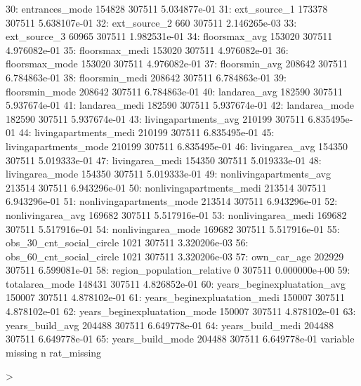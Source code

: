 \documentclass[a4paper]{article}
\begin{document}
\begin{Schunk}
\begin{Soutput}
30:               entrances_mode  154828 307511 5.034877e-01
31:                 ext_source_1  173378 307511 5.638107e-01
32:                 ext_source_2     660 307511 2.146265e-03
33:                 ext_source_3   60965 307511 1.982531e-01
34:                floorsmax_avg  153020 307511 4.976082e-01
35:               floorsmax_medi  153020 307511 4.976082e-01
36:               floorsmax_mode  153020 307511 4.976082e-01
37:                floorsmin_avg  208642 307511 6.784863e-01
38:               floorsmin_medi  208642 307511 6.784863e-01
39:               floorsmin_mode  208642 307511 6.784863e-01
40:                 landarea_avg  182590 307511 5.937674e-01
41:                landarea_medi  182590 307511 5.937674e-01
42:                landarea_mode  182590 307511 5.937674e-01
43:         livingapartments_avg  210199 307511 6.835495e-01
44:        livingapartments_medi  210199 307511 6.835495e-01
45:        livingapartments_mode  210199 307511 6.835495e-01
46:               livingarea_avg  154350 307511 5.019333e-01
47:              livingarea_medi  154350 307511 5.019333e-01
48:              livingarea_mode  154350 307511 5.019333e-01
49:      nonlivingapartments_avg  213514 307511 6.943296e-01
50:     nonlivingapartments_medi  213514 307511 6.943296e-01
51:     nonlivingapartments_mode  213514 307511 6.943296e-01
52:            nonlivingarea_avg  169682 307511 5.517916e-01
53:           nonlivingarea_medi  169682 307511 5.517916e-01
54:           nonlivingarea_mode  169682 307511 5.517916e-01
55:     obs_30_cnt_social_circle    1021 307511 3.320206e-03
56:     obs_60_cnt_social_circle    1021 307511 3.320206e-03
57:                  own_car_age  202929 307511 6.599081e-01
58:   region_population_relative       0 307511 0.000000e+00
59:               totalarea_mode  148431 307511 4.826852e-01
60:  years_beginexpluatation_avg  150007 307511 4.878102e-01
61: years_beginexpluatation_medi  150007 307511 4.878102e-01
62: years_beginexpluatation_mode  150007 307511 4.878102e-01
63:              years_build_avg  204488 307511 6.649778e-01
64:             years_build_medi  204488 307511 6.649778e-01
65:             years_build_mode  204488 307511 6.649778e-01
                        variable missing      n  rat_missing
\end{Soutput}
\begin{Sinput}
> 
\end{Sinput}
\end{Schunk}
\end{document}
